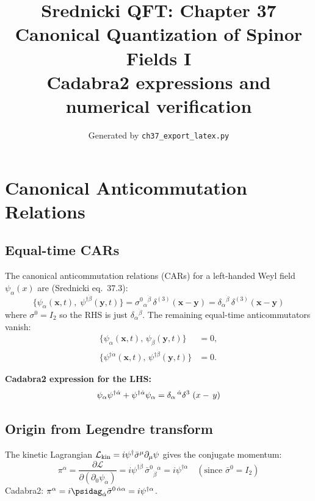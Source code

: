 \documentclass[12pt]{article}
\title{\textbf{Srednicki QFT: Chapter 37}\\[6pt]
       \large Canonical Quantization of Spinor Fields I\\[4pt]
       \normalsize Cadabra2 expressions and numerical verification}
\author{Generated by \texttt{ch37\_export\_latex.py}}
\date{}
\newcommand{\dal}{\dot{\alpha}}
\newcommand{\sigmabar}{\bar{\sigma}}
\begin{document}
\maketitle
\tableofcontents
\newpage

\section{Canonical Anticommutation Relations}

\subsection{Equal-time CARs}

The canonical anticommutation relations (CARs) for a left-handed Weyl field
$\psi_\alpha(x)$ are (Srednicki eq.~37.3):
\begin{equation}
  \boxed{
    \bigl\{\psi_\alpha(\mathbf{x},t),\;\psi^{\dagger\dot\beta}(\mathbf{y},t)\bigr\}
    = \sigma^0{}_{\alpha}{}^{\dot\beta}\,\delta^{(3)}(\mathbf{x}-\mathbf{y})
    = \delta_\alpha{}^{\dot\beta}\,\delta^{(3)}(\mathbf{x}-\mathbf{y})
  }
  \tag{37.3}
\end{equation}
where $\sigma^0 = I_2$ so the RHS is just $\delta_\alpha{}^{\dot\beta}$.  The remaining
equal-time anticommutators vanish:
\begin{align}
  \bigl\{\psi_\alpha(\mathbf{x},t),\,\psi_\beta(\mathbf{y},t)\bigr\} &= 0,
  \tag{37.4a}\\
  \bigl\{\psi^{\dagger\dot\alpha}(\mathbf{x},t),\,\psi^{\dagger\dot\beta}(\mathbf{y},t)\bigr\} &= 0.
  \tag{37.4b}
\end{align}

\textbf{Cadabra2 expression for the LHS:}
\[
  \psi_{\alpha} \psi^{\dagger \dal}\discretionary{}{}{}+\psi^{\dagger \dal} \psi_{\alpha} = \delta_{\alpha}\,^{\dal} \delta^{3\,}\left(x\discretionary{}{}{}-\,y\right)
\]

\subsection{Origin from Legendre transform}

The kinetic Lagrangian $\mathcal{L}_{\rm kin} = i\psi^\dagger \bar\sigma^\mu\partial_\mu\psi$
gives the conjugate momentum:
\begin{equation}
  \pi^\alpha = \frac{\partial\mathcal{L}}{\partial(\partial_0\psi_\alpha)}
  = i\psi^{\dagger\dot\beta}\,\bar\sigma^{0}{}_{\dot\beta}{}^\alpha
  = i\psi^{\dagger\alpha}
  \quad(\text{since }\bar\sigma^0 = I_2)
\end{equation}
Cadabra2: $\pi^\alpha = i \psidag_{\dal} \sigmabar^{0\, \dal \alpha} = i\psi^{\dagger\alpha}$.
\end{document}
